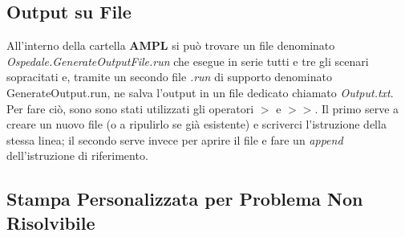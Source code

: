 \subsection{Output su File}
All'interno della cartella \textbf{AMPL} si può trovare un file denominato \textit{Ospedale.GenerateOutputFile.run} che esegue in serie tutti e tre gli scenari sopracitati e, tramite un secondo file \textit{.run} di supporto denominato GenerateOutput.run, ne salva l'output in un file dedicato chiamato \textit{Output.txt}.
Per fare ciò, sono sono stati utilizzati gli operatori $>$ e $>>$. Il primo serve a creare un nuovo file (o a ripulirlo se già esistente) e scriverci l'istruzione della stessa linea; il secondo serve invece per aprire il file e fare un \textit{append} dell'istruzione di riferimento.

\subsection{Stampa Personalizzata per Problema Non Risolvibile}